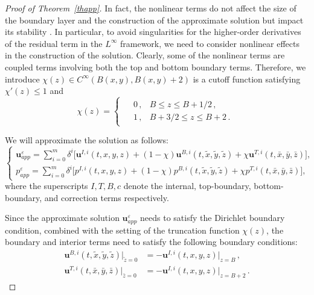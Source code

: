 \documentclass[pdflatex,sn-mathphys-num]{sn-jnl}%
\theoremstyle{thmstyleone}%
\theoremstyle{thmstyletwo}%
\theoremstyle{thmstylethree}%
\theoremstyle{thmstyletwo}
\begin{document}
\begin{proof}[Proof of Theorem~{\upshape\ref{thapp}}]
In fact, the nonlinear terms do not affect the size of the boundary layer and the construction of the approximate solution but impact its stability \cite{Gerard2005}. In particular, to avoid singularities for the higher-order derivatives of the residual term in the $L^\infty$ framework, we need to consider nonlinear effects in the construction of the solution.
Clearly, some of the nonlinear terms are coupled terms involving both the top and bottom boundary terms.
Therefore, we introduce  $\chi(z)\in C^\infty(B(x,y), B(x,y)+2)$ is a cutoff function satisfying  $\chi'(z)\leq1$ and
	\begin{equation}\label{1.17}
		\chi(z)=
		\begin{cases}
			\begin{aligned}
				&0\,,  &B\leqslant z\leqslant B+1/2\,,\\
				&1\,,  &B+3/2 \leqslant z\leqslant B+2\,.
			\end{aligned}
		\end{cases}
	\end{equation}
 

We will approximate the solution as follows:
\begin{equation}\label{2.1}
	\begin{cases}
		\boldsymbol{u}_{app}^{\varepsilon}=\sum\limits_{i=0}^{m}{\delta}^i
		\big[\boldsymbol u^{I,i}(t,x,y,z)
		+(1-\chi)\boldsymbol u^{B,i}(t,\tilde x,\tilde y,\tilde z)
		+\chi\boldsymbol u^{T,i}(t,\bar{x},\bar{y},\bar{z})\big]
		,\\
		p_{app}^{\varepsilon}=\sum\limits_{i=0}^{m}{\delta}^i\big[p^{I,i}(t,x,y,z)+(1-\chi)p^{B,i}(t,\tilde x,\tilde y,\tilde z)+\chi p^{T,i}(t,\bar{x},\bar{y},\bar{z})
		\big],
	\end{cases}
\end{equation}
where the superscripts $I, T, B, c$ denote the internal, top-boundary, bottom-boundary, and correction terms respectively.  


Since the approximate solution $\boldsymbol{u}^\varepsilon_{app}$ needs to satisfy the Dirichlet boundary condition, combined with the setting of the truncation function $\chi(z)$, the boundary and interior terms need to satisfy the following boundary conditions:
\begin{align}
	\boldsymbol u^{B,i}(t,\tilde{x},\tilde{y},\tilde{z})|_{\tilde z=0}&=-\boldsymbol u^{I,i}(t,x,y,z)|_{z=B}\,,\label{2.2}\\
	\boldsymbol u^{T,i}(t,\bar{x},\bar{y},\bar{z})|_{\bar z=0}&=-\boldsymbol u^{I,i}(t,x,y,z)|_{z=B+2}\,.\label{2.3}
\end{align}




\end{proof}
\end{document}
